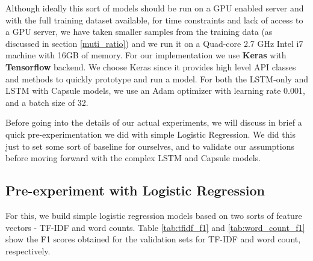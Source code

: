 \documentclass[11pt,twocolumn,letterpaper]{article}
\begin{document}
Although ideally this sort of models should be run on a GPU enabled server and with the full training dataset available, for time constraints and lack of access to a GPU server, we have taken smaller samples from the training data (as discussed in section \ref{muti_ratio}) and we run it on a Quad-core 2.7 GHz Intel i7 machine with 16GB of memory. For our implementation we use \textbf{Keras} with \textbf{Tensorflow} backend. We choose Keras since it provides high level API classes and methods to quickly prototype and run a model. For both the LSTM-only and LSTM with Capsule models, we use an Adam optimizer with learning rate 0.001, and a batch size of 32.

Before going into the details of our actual experiments, we will discuss in brief a quick pre-experimentation we did with simple Logistic Regression. We did this just to set some sort of baseline for ourselves, and to validate our assumptions before moving forward with the complex LSTM and Capsule models.

\subsection{Pre-experiment with Logistic Regression} \label{sec:logistic}

For this, we build simple logistic regression models based on two sorts of feature vectors - TF-IDF and word counts. Table \ref{tab:tfidf_f1} and \ref{tab:word_count_f1} show the F1 scores obtained for the validation sets for TF-IDF and word count, respectively.  
\end{document}
